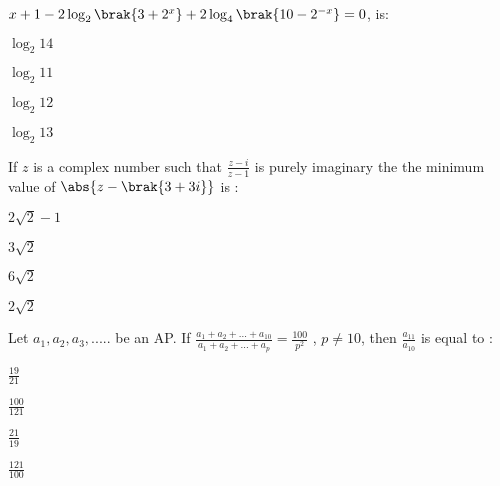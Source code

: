 $x+1-2\log_2 \brak{3+2^x}+2\log_4 \brak{10-2^{-x}}=0$, is:
\begin{enumerate}
\begin{multicols}{2}
\item $\log_2 14$
\item $\log_2 11$
\end{multicols}
\begin{multicols}{2}
\item $\log_2 12$
\item $\log_2 13$
\end{multicols}
\end{enumerate}
\item %
If $z$ is a complex number such that $\frac{z-i}{z-1}$ is purely imaginary the the minimum value of $\abs{ z-\brak{3+3i}}$ is :
\begin{enumerate}
\begin{multicols}{2}
\item $2\sqrt{2}-1$
\item $3\sqrt{2}$
\end{multicols}
\begin{multicols}{2}
\item $6\sqrt{2}$
\item $2\sqrt{2}$
\end{multicols}
\end{enumerate}
\item %
Let $a_{1},a_{2},a_{3},.....$ be an AP. If $\frac{a_{1}+a_{2}+...+a_{10}}{a_{1}+a_{2}+...+a_{p}}  = \frac{100}{p^2}$ , $p\neq 10$, then $\frac{a_{11}}{a_{10}}$ is equal to :
\begin{enumerate}
\begin{multicols}{2}
\item $\frac{19}{21}$
\item $\frac{100}{121}$
\end{multicols}
\begin{multicols}{2}
\item  $\frac{21}{19}$
\item $\frac{121}{100}$
\end{multicols}
\end{enumerate}

